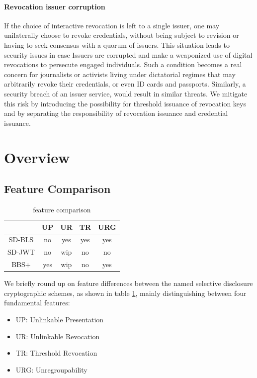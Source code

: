 \paragraph{Revocation issuer corruption}

If the choice of interactive revocation is left to a single issuer,
one may unilaterally choose to revoke credentials, without being
subject to revision or having to seek consensus with a quorum of
issuers. This situation leads to security issues in case Issuers are
corrupted and make a weaponized use of digital revocations to
persecute engaged individuals. Such a condition becomes a real concern
for journalists or activists living under dictatorial regimes that may
arbitrarily revoke their credentials, or even ID cards and
passports. Similarly, a security breach of an issuer service, would
result in similar threats. We mitigate this risk by introducing the
possibility for threshold issuance of revocation keys and by
separating the responsibility of revocation issuance and credential
issuance.


\section{Overview}

\subsection{Feature Comparison}

\begin{table}[]
\centering
\renewcommand{\arraystretch}{2}
\begin{tabular}{ccccc}
\hline
       & \textbf{UP} & \textbf{UR} & \textbf{TR} & \textbf{URG} \\ \hline
SD-BLS & no          & yes         & yes         & yes \\ \hline
SD-JWT & no          & wip         & no          & no  \\ \hline
BBS+   & yes         & wip         & no          & yes \\ \hline
\end{tabular}
\vspace*{5mm}
\caption{feature comparison}
\label{tab:features}
\end{table}

We briefly round up on feature differences between the named selective
disclosure cryptographic schemes, as shown in table
\ref{tab:features}, mainly distinguishing between four fundamental
features:
\begin{itemize}
\item UP: Unlinkable Presentation
\item UR: Unlinkable Revocation
\item TR: Threshold Revocation
\item URG: Unregroupability
\end{itemize}

